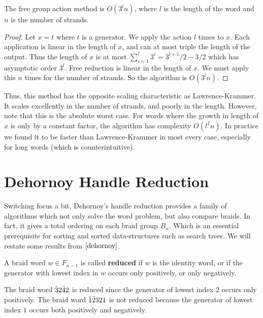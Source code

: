 \documentclass[12pt]{thesis}
\begin{document}
\begin{proposition}
    The free group action method is $O(3^{l} n)$, where $l$ is the length of the word
    and $n$ is the number of strands.
\end{proposition}

\begin{proof}
    Let $x = t$ where $t$ is a generator.
    We apply the action $l$ times to $x$.
    Each application is linear in the length of $x$,
    and can at most triple the length of the output.
    Thus the length of $x$ is at most $\sum_{i=1}^{l} 3^{i} = 3^{l+1}/2 - 3/2$ which has asymptotic order $3^{l}$.
    Free reduction is linear in the length of $x$.
    We must apply this $n$ times for the number of strands.
    So the algorithm is $O(3^{l}n)$.
\end{proof}

Thus, this method has the opposite scaling characteristic as Lawrence-Krammer.
It scales excellently in the number of strands,
and poorly in the length.
However, note that this is the absolute worst case.
For words where the growth in length of $x$ is only
by a constant factor, the algorithm has complexity $O(l^{2}n)$.
In practice we found it to be faster than Lawrence-Krammer
in most every case, especially for long words (which is counterintuitive).

\section{Dehornoy Handle Reduction}

Switching focus a bit,
Dehornoy's handle reduction \cite{dehornoy}
provides a family of algorithms which not only solve the word problem, 
but also compare braids.
In fact, it gives a total ordering on each braid group $B_{n}$.
Which is an essential prerequisite for sorting
and sorted data-structures such as search trees.
We will restate some results from $\cite{dehornoy}$.

\begin{definition}
    A braid word $w \in F_{n-1}$ is called \textbf{reduced} if $w$ is the identity word,
    or if the generator with lowest index in $w$ occurs only positively,
    or only negatively.
\end{definition}

\begin{example}
    The braid word $\bar{3} 2 \bar{4} 2$ is reduced since the generator
    of lowest index $2$ occurs only positively.
    The braid word $\bar{1} \bar{2} 3 2 1$ is not reduced
    because the generator of lowest index $1$ occurs
    both positively and negatively.
\end{example}
\end{document}
